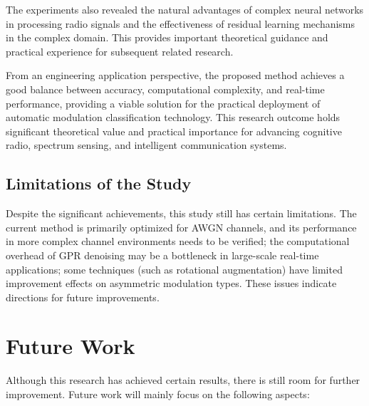 \documentclass[conference]{IEEEtran}
\begin{document}
The experiments also revealed the natural advantages of complex neural networks in processing radio signals and the effectiveness of residual learning mechanisms in the complex domain. This provides important theoretical guidance and practical experience for subsequent related research.

From an engineering application perspective, the proposed method achieves a good balance between accuracy, computational complexity, and real-time performance, providing a viable solution for the practical deployment of automatic modulation classification technology. This research outcome holds significant theoretical value and practical importance for advancing cognitive radio, spectrum sensing, and intelligent communication systems.

\subsection{Limitations of the Study}

Despite the significant achievements, this study still has certain limitations. The current method is primarily optimized for AWGN channels, and its performance in more complex channel environments needs to be verified; the computational overhead of GPR denoising may be a bottleneck in large-scale real-time applications; some techniques (such as rotational augmentation) have limited improvement effects on asymmetric modulation types. These issues indicate directions for future improvements.

\section{Future Work}
Although this research has achieved certain results, there is still room for further improvement. Future work will mainly focus on the following aspects:
\end{document}
